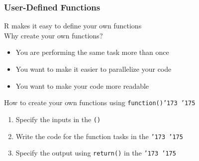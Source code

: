 \documentclass{beamer}\usepackage[]{graphicx}\usepackage[]{xcolor}
\begin{document}
\begin{frame}\frametitle{User-Defined Functions}
    R makes it easy to define your own functions \\
    \vspace{2ex}
    Why create your own functions?
    \begin{itemize}
        \item You are performing the same task more than once
        \item You want to make it easier to parallelize your code
        \item You want to make your code more readable
    \end{itemize}
    \vspace{2ex}
    How to create your own functions using \texttt{function()\char '173 \char '175}
    \begin{enumerate}
        \item Specify the inputs in the \texttt{()}
        \item Write the code for the function tasks in the \texttt{\char '173 \char '175}
        \item Specify the output using \texttt{return()} in the \texttt{\char '173 \char '175}
    \end{enumerate}
\end{frame}
\end{document}
